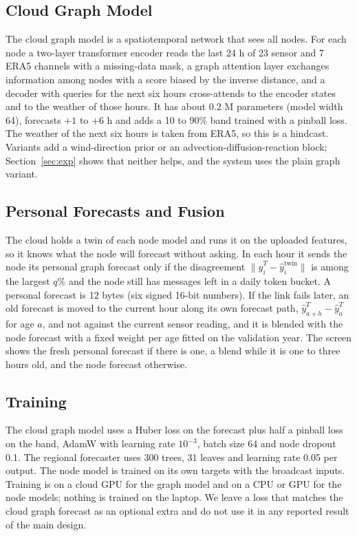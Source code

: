 \documentclass[journal]{IEEEtran}
\begin{document}
\subsection{Cloud Graph Model}
The cloud graph model is a spatiotemporal network that sees all nodes. For each node a two-layer transformer encoder \cite{vaswani2017attention} reads the last 24 h of 23 sensor and 7 ERA5 channels with a missing-data mask, a graph attention layer \cite{velickovic2018gat} exchanges information among nodes with a score biased by the inverse distance, and a decoder with queries for the next six hours cross-attends to the encoder states and to the weather of those hours. It has about 0.2 M parameters (model width 64), forecasts $+1$ to $+6$ h and adds a 10 to 90\% band trained with a pinball loss. The weather of the next six hours is taken from ERA5, so this is a hindcast. Variants add a wind-direction prior or an advection-diffusion-reaction block; Section~\ref{sec:exp} shows that neither helps, and the system uses the plain graph variant.

\subsection{Personal Forecasts and Fusion}
\label{sec:fusion}
The cloud holds a twin of each node model and runs it on the uploaded features, so it knows what the node will forecast without asking. In each hour it sends the node its personal graph forecast only if the disagreement $\lVert\hat y^{T}_i-\hat y^{\mathrm{twin}}_i\rVert$ is among the largest $q\%$ and the node still has messages left in a daily token bucket. A personal forecast is 12 bytes (six signed 16-bit numbers). If the link fails later, an old forecast is moved to the current hour along its own forecast path, $\hat y^{T}_{a+h}-\hat y^{T}_{a}$ for age $a$, and not against the current sensor reading, and it is blended with the node forecast with a fixed weight per age fitted on the validation year. The screen shows the fresh personal forecast if there is one, a blend while it is one to three hours old, and the node forecast otherwise.

\subsection{Training}
The cloud graph model uses a Huber loss on the forecast plus half a pinball loss on the band, AdamW \cite{loshchilov2019adamw} with learning rate $10^{-3}$, batch size 64 and node dropout 0.1. The regional forecaster uses 300 trees, 31 leaves and learning rate 0.05 per output. The node model is trained on its own targets with the broadcast inputs. Training is on a cloud GPU for the graph model and on a CPU or GPU for the node models; nothing is trained on the laptop. We leave a loss that matches the cloud graph forecast as an optional extra and do not use it in any reported result of the main design.
\end{document}
